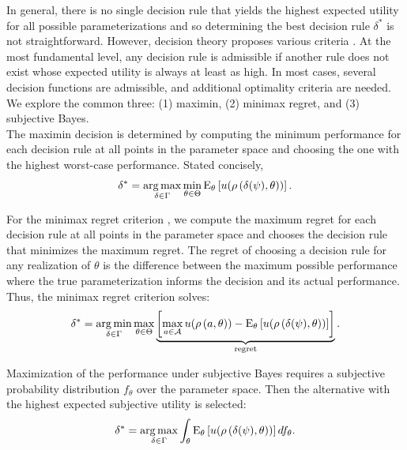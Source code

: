 In general, there is no single decision rule that yields the highest expected utility for all possible parameterizations and so determining the best decision rule  $\delta^*$ is not straightforward. However, decision theory proposes various criteria \citep{Gilboa.2009,Marinacci.2015}. At the most fundamental level, any decision rule is admissible if another rule does not exist whose expected utility is always at least as high. In most cases, several decision functions are admissible, and additional optimality criteria are needed. We explore the common three: (1) maximin, (2) minimax regret, and (3) subjective Bayes.\\

The maximin decision \citep{Gilboa.1989,Wald.1950} is determined by computing the minimum performance for each decision rule at all points in the parameter space and choosing the one with the highest worst-case performance. Stated concisely,
%
\begin{align*}
\delta^*= \operatorname*{arg\,max}_{\delta \in \Gamma } \min_{\theta\in \Theta} \mathrm{E}_{\theta}\left[u(\rho\left(\delta(\psi), \theta\right))\right].
\end{align*}

For the minimax regret criterion \citep{Manski.2004,Niehans.1948}, we compute the maximum regret for each decision rule at all points in the parameter space and chooses the decision rule that minimizes the maximum regret. The regret of choosing a decision rule for any realization of $\theta$ is the difference between the maximum possible performance where the true parameterization informs the decision and its actual performance. Thus, the minimax regret criterion solves:
%
\begin{align*}
\delta^* =  \operatorname*{arg\,min}_{\delta \in \Gamma } \max_{\theta\in \Theta}  \underbrace{\left[\max_{a \in \mathcal{A}}  u(\rho\left(a, \theta\right))  - \mathrm{E}_{\theta}\left[u(\rho\left(\delta(\psi), \theta\right)) \right]\right]}_{\text{regret}}.
\end{align*}

Maximization of the performance under subjective Bayes \citep{Savage.1954} requires a subjective probability distribution $f_{\theta}$ over the parameter space. Then the alternative with the highest expected subjective utility is selected:
%
\begin{align*}
\delta^* = \operatorname*{arg\,max}_{\delta \in \Gamma }  \int_{\theta} \mathrm{E}_{\theta}\left[u(\rho\left(\delta(\psi), \theta\right))\right]df_{\theta}.
\end{align*}
